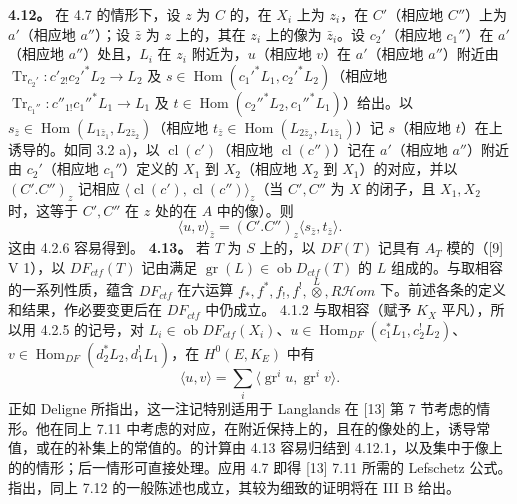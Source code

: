 \textbf{4.12。} 在 4.7 的情形下，设 $z$ 为 $C$ 的，在 $X_i$ 上为 $z_i$，在 $C'$（相应地 $C''$）上为 $a'$（相应地 $a''$）；设 $\bar z$ 为 $z$ 上的，其在 $z_i$ 上的像为 $\bar z_i$。设 $c_2'$（相应地 $c_1''$）在 $a'$（相应地 $a''$）处且，$L_i$ 在 $z_i$ 附近为，$u$（相应地 $v$）在 $a'$（相应地 $a''$）附近由 $\operatorname{Tr}_{c_2'}:c'_{2!}c_2'^*L_2\to L_2$ 及 $s\in\operatorname{Hom}(c_1'^*L_1,c_2'^*L_2)$（相应地 $\operatorname{Tr}_{c_1''}:c''_{1!}c_1''^*L_1\to L_1$ 及 $t\in\operatorname{Hom}(c_2''^*L_2,c_1''^*L_1)$）给出。以 $s_{\bar z}\in\operatorname{Hom}(L_{1\bar z_1},L_{2\bar z_2})$（相应地 $t_{\bar z}\in\operatorname{Hom}(L_{2\bar z_2},L_{1\bar z_1})$）记 $s$（相应地 $t$）在上诱导的。如同 3.2 a)，以 $\operatorname{cl}(c')$（相应地 $\operatorname{cl}(c'')$）记在 $a'$（相应地 $a''$）附近由 $c_2'$（相应地 $c_1''$）定义的 $X_1$ 到 $X_2$（相应地 $X_2$ 到 $X_1$）的对应，并以 $(C'.C'')_z$ 记相应 $\langle\operatorname{cl}(c'),\operatorname{cl}(c'')\rangle_z$（当 $C',C''$ 为 $X$ 的闭子，且 $X_1,X_2$ 时，这等于
$C',C''$ 在 $z$ 处的在 $A$ 中的像）。则
\[\langle u,v\rangle_{\bar z}=(C'.C'')_z\langle s_{\bar z},t_{\bar z}\rangle.\tag{4.12.1}\]
这由 4.2.6 容易得到。
\textbf{4.13。} 若 $T$ 为 $S$ 上的，以 $DF(T)$ 记具有 $A_T$ 模的（[9] V 1），以 $DF_{ctf}(T)$ 记由满足 $\operatorname{gr}(L)\in\operatorname{ob}D_{ctf}(T)$ 的 $L$ 组成的。与取相容的一系列性质，蕴含 $DF_{ctf}$ 在六运算 $f_*,f^*,f_!,f^!,\mathbin{\overset L\otimes},R\mathcal Hom$ 下。前述各条的定义和结果，作必要变更后在 $DF_{ctf}$ 中仍成立。 4.1.2 与取相容（赋予 $K_X$ 平凡），所以用 4.2.5 的记号，对 $L_i\in\operatorname{ob}DF_{ctf}(X_i)$、$u\in\operatorname{Hom}_{DF}(c_1^*L_1,c_2^!L_2)$、$v\in\operatorname{Hom}_{DF}(d_2^*L_2,d_1^!L_1)$，在 $H^0(E,K_E)$ 中有
\[\langle u,v\rangle=\sum_i\langle\operatorname{gr}^iu,\operatorname{gr}^iv\rangle.\tag{4.13.1}\]
正如 Deligne 所指出，这一注记特别适用于 Langlands 在 [13] 第 7 节考虑的情形。他在同上 7.11 中考虑的对应，在附近保持上的，且在的像处的上，诱导常值，或在的补集上的常值的。的计算由 4.13 容易归结到 4.12.1，以及集中于像上的的情形；后一情形可直接处理。应用 4.7 即得 [13] 7.11 所需的 Lefschetz 公式。指出，同上 7.12 的一般陈述也成立，其较为细致的证明将在 III B 给出。
